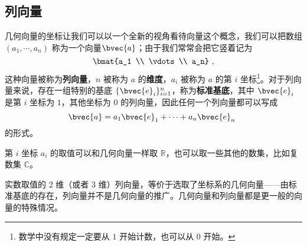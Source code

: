 

\subsection{列向量}

几何向量的坐标让我们可以以一个全新的视角看待向量这个概念，我们可以把数组 $(a_1, \cdots, a_n)$ 称为一个向量$\bvec{a}$；由于我们常常会把它竖着记为
\begin{equation}
\bmat{a_1 \\ \vdots \\ a_n}~,
\end{equation}
这种向量被称为\textbf{列向量}，$n$ 被称为 $a$ 的\textbf{维度}，$a_i$ 被称为 $a$ 的第 $i$ 坐标\footnote{数学中没有规定一定要从 $1$ 开始计数，也可以从 $0$ 开始。}。对于列向量来说，存在一组特别的基底 $\{\bvec{e}_i\}_{i = 1}^n$，称为\textbf{标准基底}，其中 $\bvec{e}_i$ 是第 $i$ 坐标为 $1$，其他坐标为 $0$ 的列向量，因此任何一个列向量都可以写成
\begin{equation}
\bvec{a} = a_1 \bvec{e}_1 + \cdots + a_n \bvec{e}_n~
\end{equation}
的形式。

第 $i$ 坐标 $a_i$ 的取值可以和几何向量一样取 $\mathbb{R}$，也可以取一些其他的数集，比如复数集 $\mathbb{C}$。


实数取值的 $2$ 维（或者 $3$ 维）列向量，等价于选取了坐标系的几何向量——由标准基底的存在，列向量并不是几何向量的推广。几何向量和列向量都是更一般的向量的特殊情况。
